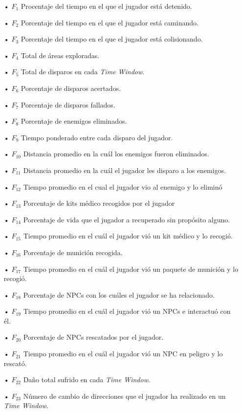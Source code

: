 \documentclass[conference]{IEEEtran}
\begin{document}
\begin{itemize}
\item[•] $F_1$ Procentaje del tiempo en el que el jugador está detenido.
\item[•] $F_2$ Porcentaje del tiempo en el que el jugador está caminando.
\item[•] $F_3$ Porcentaje del tiempo en el que el jugador está colisionando.
\item[•] $F_4$ Total de áreas exploradas.
\item[•] $F_5$ Total de disparos en cada \textit{Time Window}.
\item[•] $F_6$ Porcentaje de disparos acertados.
\item[•] $F_7$ Porcentaje de disparos fallados.
\item[•] $F_8$ Porcentaje de enemigos eliminados.
\item[•] $F_9$ Tiempo ponderado entre cada disparo del jugador.
\item[•] $F_10$ Distancia promedio en la cuál los enemigos fueron eliminados.
\item[•] $F_11$ Distancia promedio en la cuál el jugador les disparo a los enemigos.
\item[•] $F_12$ Tiempo promedio en el cual el jugador vio al enemigo y lo eliminó
\item[•] $F_13$ Porcentaje de kits médico recogidos por el jugador
\item[•] $F_14$ Porcentaje de vida que el jugador a recuperado sin propósito alguno.
\item[•] $F_15$ Tiempo promedio en el cuál el jugador vió un kit médico y lo recogió.
\item[•] $F_16$ Porcentaje de munición recogida.
\item[•] $F_17$ Tiempo promedio en el cuál el jugador vió un paquete de munición y lo recogió.
\item[•] $F_18$ Porcentaje de NPCs con los cuáles el jugador se ha relacionado.
\item[•] $F_19$ Tiempo promedio en el cuál el jugador vió un NPCs e interactuó con él.
\item[•] $F_20$ Porcentaje de NPCs rescatados por el jugador.
\item[•] $F_21$ Tiempo promedio en el cuál el jugador vió un NPC en peligro y lo rescató.
\item[•] $F_22$ Daño total sufrido en cada \textit{Time Window}.
\item[•] $F_23$ Número de cambio de direcciones que el jugador ha realizado en un \textit{Time Window}.

\end{itemize}
\end{document}
